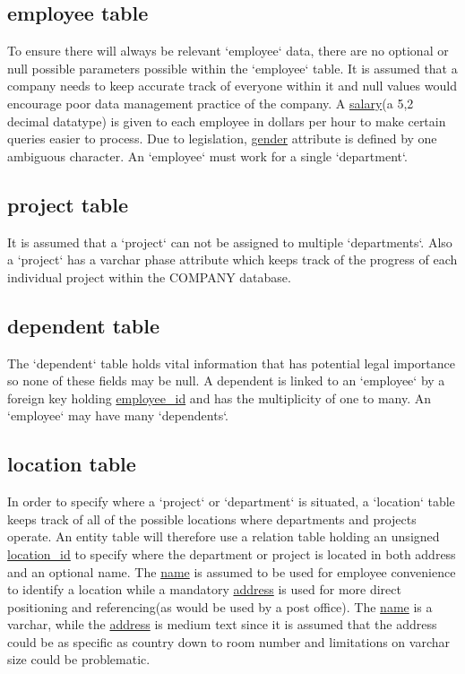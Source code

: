 \documentclass[11pt,letterpaper]{article}
\begin{document}
	\subsection{employee table}
	To ensure there will always be relevant `employee` data, there are no optional or null possible parameters possible within the `employee`  table. It is assumed that a company needs to keep accurate track of everyone within it and null values would encourage poor data management practice of the company. A \uline{salary}(a 5,2 decimal datatype) is given to each employee in dollars per hour to make certain queries easier to process. Due to legislation, \uline{gender} attribute is defined by one ambiguous character. An `employee` must work for a single `department`.\\
	
		\subsection{project table}
	 It is assumed that a `project` can not be assigned to multiple `departments`. Also a `project` has a varchar phase attribute which keeps track of the progress of each individual project within the COMPANY database.\\

		\subsection{dependent table}
The `dependent` table holds vital information that has potential legal importance so none of these fields may be null. A dependent is linked to an `employee` by a foreign key holding \uline{employee\_id} and has the multiplicity of one to many. An `employee` may have many `dependents`. \\

\subsection{location table}
In order to specify where a `project` or `department` is situated, a `location` table keeps track of all of the possible locations where departments and projects operate. An entity table will therefore use a relation table holding an unsigned \uline{location\_id} to specify where the department or project is located in both address and an optional name. The \uline{name} is assumed to be used for employee convenience to identify a location while a mandatory \uline{address} is used for more direct positioning and referencing(as would be used by a post office). The \uline{name} is a varchar, while the \uline{address} is medium text since it is assumed that the address could be as specific as country down to room number and limitations on varchar size could be problematic.\\
\end{document}
